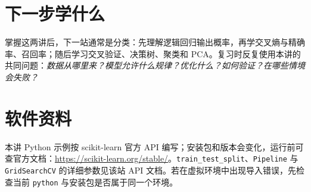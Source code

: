 \documentclass[UTF8,11pt,oneside]{ctexbook}
\begin{document}
\section{下一步学什么}
掌握这两讲后，下一站通常是分类：先理解逻辑回归输出概率，再学交叉熵与精确率、召回率；随后学习交叉验证、决策树、聚类和 PCA。复习时反复使用本讲的共同问题：\emph{数据从哪里来？模型允许什么规律？优化什么？如何验证？在哪些情境会失败？}

\section{软件资料}
本讲 Python 示例按 scikit-learn 官方 API 编写；安装包和版本会变化，运行前可查官方文档：\url{https://scikit-learn.org/stable/}。\texttt{train\_test\_split}、\texttt{Pipeline} 与 \texttt{GridSearchCV} 的详细参数见该站 API 文档。若在虚拟环境中出现导入错误，先检查当前 \texttt{python} 与安装包是否属于同一个环境。
\end{document}
